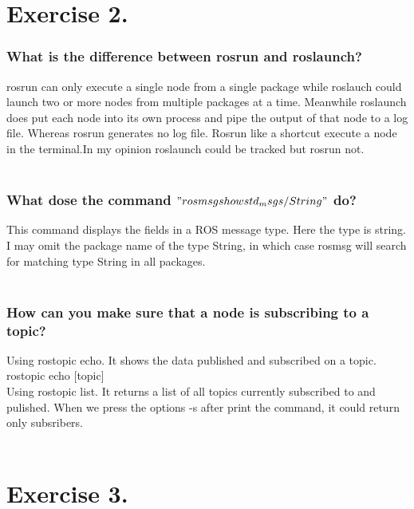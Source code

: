 \documentclass{ROS}
\begin{document}
\section*{Exercise 2.}
\subsubsection*{What is the difference between rosrun and roslaunch?}
rosrun can only execute a single node from a single package while roslauch could launch two or more nodes from multiple packages at a time. Meanwhile roslaunch does put each node into its own process and pipe the output of that node to a log file. Whereas rosrun generates no log file. Rosrun like a shortcut execute a node in the terminal.In my opinion roslaunch could be tracked but rosrun not.\\
\\
\subsubsection*{What dose the command $"rosmsg show std_msgs/String"$ do?}
This command displays the fields in a ROS message type. Here the type is string. I may omit the package name of the type String, in which case rosmsg will search for matching type String in all packages.\\ 
\\
\subsubsection*{How can you make sure that a node is subscribing to a topic?}
Using rostopic echo. It shows the data published and subscribed on a topic.\\
rostopic echo [topic]\\
Using rostopic list. It returns a list of all topics currently subscribed to and pulished. When we press the options -s after print the command, it could return only subsribers.\\
\\
\section*{Exercise 3.}
\end{document}
